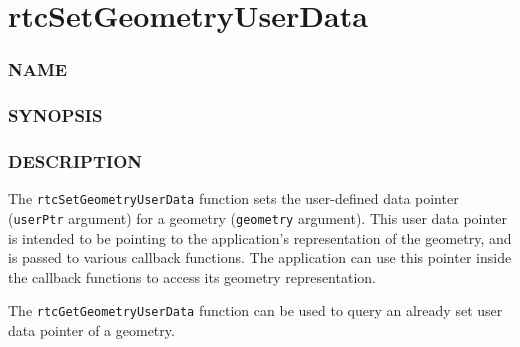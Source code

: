 \pagebreak

\section{rtcSetGeometryUserData}\label{rtcsetgeometryuserdata}

\subsubsection{NAME}\label{name}

\begin{Shaded}
\begin{Highlighting}[]
\OperatorTok{{-}}\OperatorTok{{-}}
\end{Highlighting}
\end{Shaded}

\subsubsection{SYNOPSIS}\label{synopsis}

\begin{Shaded}
\begin{Highlighting}[]

\OperatorTok{(}\OperatorTok{,} \OperatorTok{*}\OperatorTok{);}
\end{Highlighting}
\end{Shaded}

\subsubsection{DESCRIPTION}\label{description}

The \texttt{rtcSetGeometryUserData} function sets the user-defined data
pointer (\texttt{userPtr} argument) for a geometry (\texttt{geometry}
argument). This user data pointer is intended to be pointing to the
application's representation of the geometry, and is passed to various
callback functions. The application can use this pointer inside the
callback functions to access its geometry representation.

The \texttt{rtcGetGeometryUserData} function can be used to query an
already set user data pointer of a geometry.

